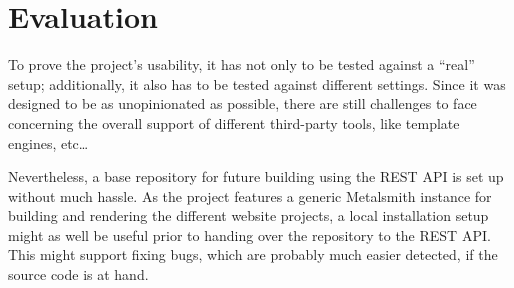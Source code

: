 \chapter{Evaluation}
\label{cha:evaluation}

To prove the project's usability, it has not only to be tested against a ``real'' setup; additionally, it also has to be tested against different settings. Since it was designed to be as unopinionated as possible, there are still challenges to face concerning the overall support of different third-party tools, like template engines, etc\ldots

Nevertheless, a base repository for future building using the REST API is set up without much hassle. As the project features a generic Metalsmith instance for building and rendering the different website projects, a local installation setup might as well be useful prior to handing over the repository to the REST API. This might support fixing bugs, which are probably much easier detected, if the source code is at hand.






